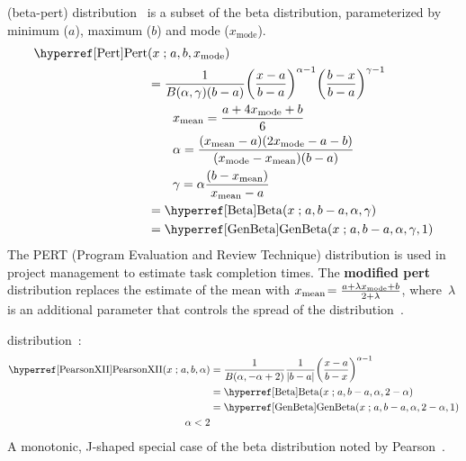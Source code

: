  (beta-pert) distribution~\cite{Clark1962, Vose2000} is a subset of the beta distribution, parameterized by minimum ($a$), maximum ($b$) and mode ($x_\text{mode}$).  
\begin{align}
\label{Pert}
\opr{Pert}&(x\given a,b,x_\text{mode}) \checked
\\ \notag
&=  
 \frac{1}{B(\alpha, \gamma) (b-a)}
\Left(\frac{x-a}{b-a}\Right)^{\alpha-1} \Left(\frac{b-x}{b-a}\Right)^{\gamma-1} \checked
\\ \notag & \qquad x_\text{mean} = \frac{a+4x_\text{mode}+b}{6} \checked
\\ & \qquad \alpha = \frac{(x_\text{mean}-a)(2 x_\text{mode} - a - b)}{(x_\text{mode}-x_\text{mean})(b-a)} \checked
\notag 
\\\notag  & \qquad \gamma = \alpha\frac{(b-x_\text{mean})}{x_\text{mean}-a} \checked
\\ & = \opr{Beta}(x\given a,b-a,\alpha,\gamma) \checked \notag
\\ & = \opr{GenBeta}(x\given  a,b-a,\alpha,\gamma, 1)  \checked \notag
\end{align}
The PERT (Program Evaluation and Review Technique) distribution is used in project management to estimate task completion times. The {\bf modified pert} distribution replaces the estimate of the mean with $x_\text{mean}\! = \frac{a+\lambda x_\text{mode}+b}{2+\lambda}$, where~$\lambda$ is an additional parameter that controls the spread of the distribution~\cite{Vose2000}.






 distribution~\cite{Pearson1916}: 
\begin{align}
\label{PearsonXII}
\opr{PearsonXII}(x\given a,b,\alpha) &=  \frac{1}{B(\alpha, -\alpha+2)} \frac{1}{|b-a|}\Left( \frac{x-a}{b-x} \Right)^{\alpha -1} 
\checked
\\ &= \opr{Beta}(x\given a,b-a ,\alpha, 2-\alpha) \notag  \checked
\\ &= \opr{GenBeta}(x\given a,b-a ,\alpha, 2-\alpha,1) \notag \checked
\\ \qquad \alpha<2 \notag
\end{align}
A monotonic, J-shaped special case of the beta distribution noted by Pearson~\cite{Pearson1916}.


